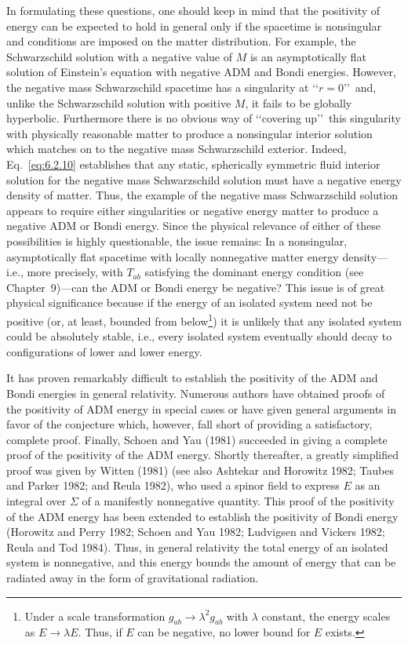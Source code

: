 In formulating these questions, one should keep in mind that the positivity of energy
can be expected to hold in general only if the spacetime is nonsingular and
conditions are imposed on the matter distribution. For example, the Schwarzschild
solution with a negative value of \(M\) is an asymptotically flat solution of Einstein's
equation with negative ADM and Bondi energies. However, the negative mass
Schwarzschild spacetime has a singularity at \lq\lq \(r=0\)\rq\rq\ and, unlike the
Schwarzschild solution with positive \(M\), it fails to be globally hyperbolic.
Furthermore there is no obvious way of \lq\lq covering up\rq\rq\ this singularity with
physically reasonable matter to produce a nonsingular interior solution which matches
on to the negative mass Schwarzschild exterior. Indeed, Eq.~\eqref{eq:6.2.10}
establishes that any static, spherically symmetric fluid interior solution for the
negative mass Schwarzschild solution must have a negative energy density of matter.
Thus, the example of the negative mass Schwarzschild solution appears to require
either singularities or negative energy matter to produce a negative ADM or Bondi
energy. Since the physical relevance of either of these possibilities is highly
questionable, the issue remains: In a nonsingular, asymptotically flat spacetime with
locally nonnegative matter energy density---i.e., more precisely, with \(T_{ab}\)
satisfying the dominant energy condition (see Chapter~9)---can the ADM or Bondi
energy be negative? This issue is of great physical significance because if the energy
of an isolated system need not be positive (or, at least, bounded from
below\footnote{Under a scale transformation \(g_{ab}\to\lambda^2g_{ab}\) with
\(\lambda\) constant, the energy scales as \(E\to\lambda E\). Thus, if \(E\) can be
negative, no lower bound for \(E\) exists.}) it is unlikely that any isolated system
could be absolutely stable, i.e., every isolated system eventually should decay to
configurations of lower and lower energy.

It has proven remarkably difficult to establish the positivity of the ADM and Bondi
energies in general relativity. Numerous authors have obtained proofs of the
positivity of ADM energy in special cases or have given general arguments in favor of
the conjecture which, however, fall short of providing a satisfactory, complete proof.
Finally, Schoen and Yau (1981) succeeded in giving a complete proof of the positivity
of the ADM energy. Shortly thereafter, a greatly simplified proof was given by Witten
(1981) (see also Ashtekar and Horowitz 1982; Taubes and Parker 1982; and Reula
1982), who used a spinor field to express \(E\) as an integral over \(\Sigma\) of a
manifestly nonnegative quantity. This proof of the positivity of the ADM energy has
been extended to establish the positivity of Bondi energy (Horowitz and Perry 1982;
Schoen and Yau 1982; Ludvigsen and Vickers 1982; Reula and Tod 1984). Thus, in
general relativity the total energy of an isolated system is nonnegative, and this
energy bounds the amount of energy that can be radiated away in the form of
gravitational radiation.
